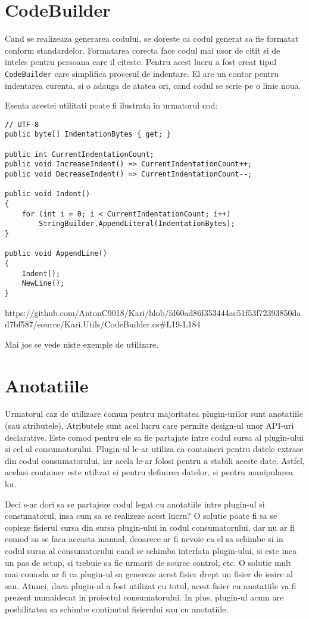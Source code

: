 \documentclass{report}
\begin{document}
\section{CodeBuilder}

Cand se realizeaza generarea codului, se doreste ca codul generat sa fie
formatat conform standardelor. Formatarea corecta face codul mai usor de
citit si de inteles pentru persoana care il citeste. Pentru acest lucru
a fost creat tipul \texttt{CodeBuilder} care simplifica procesul de
indentare. El are un contor pentru indentarea curenta, si o adauga de
atatea ori, cand codul se scrie pe o linie noua.

Esenta acestei utilitati poate fi ilustrata in urmatorul cod:

\begin{lstlisting}
// UTF-8
public byte[] IndentationBytes { get; }

public int CurrentIndentationCount;
public void IncreaseIndent() => CurrentIndentationCount++;
public void DecreaseIndent() => CurrentIndentationCount--;

public void Indent()
{
    for (int i = 0; i < CurrentIndentationCount; i++)
        StringBuilder.AppendLiteral(IndentationBytes);
}

public void AppendLine() 
{ 
    Indent();
    NewLine();
}
\end{lstlisting}

https://github.com/AntonC9018/Kari/blob/fd60ad86f353444ae51f53f72393850dad7bf587/source/Kari.Utils/CodeBuilder.cs\#L19-L184

Mai jos se vede niste exemple de utilizare.

\section{Anotatiile}

Urmatorul caz de utilizare comun pentru majoritatea plugin-urilor sunt
anotatiile (sau atributele). Atributele sunt acel lucru care permite
design-ul unor API-uri declarative. Este comod pentru ele sa fie
partajate intre codul sursa al plugin-ului si cel al consumatorului.
Plugin-ul le-ar utiliza ca containeri pentru datele extrase din codul
consumatorului, iar acela le-ar folosi pentru a stabili aceste date.
Astfel, acelasi container este utilizat si pentru definirea datelor, si
pentru manipularea lor.

Deci s-ar dori sa se partajeze codul legat cu anotatiile intre plugin-ul
si consumatorul, insa cum sa se realizeze acest lucru? O solutie poate
fi sa se copieze fisierul sursa din sursa plugin-ului in codul
consumatorului, dar nu ar fi comod sa se faca aceasta manual, deoarece
ar fi nevoie ca el sa schimbe si in codul sursa al consumatorului cand
se schimba interfata plugin-ului, si este inca un pas de setup, si
trebuie sa fie urmarit de source control, etc. O solutie mult mai comoda
ar fi ca plugin-ul sa genereze acest fisier drept un fisier de iesire al
sau. Atunci, daca plugin-ul a fost utilizat cu totul, acest fisier cu
anotatiile va fi prezent numaidecat in proiectul consumatorului. In
plus, plugin-ul acum are posbilitatea sa schimbe continutul fisierului
sau cu anotatiile.
\end{document}
